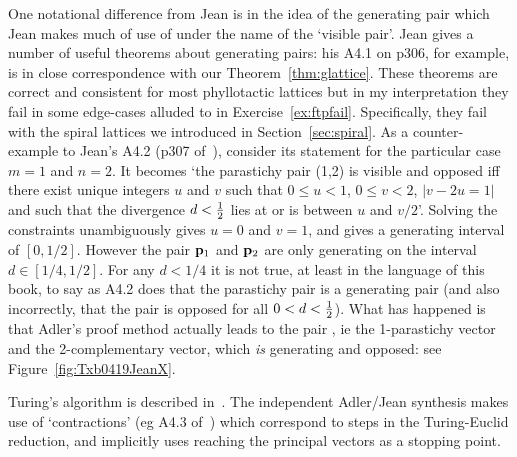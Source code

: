 One notational difference from Jean is in the idea of the generating pair which Jean makes much of use of under the name of the `visible pair'. Jean gives a number of useful theorems about generating pairs: his A4.1 on p306, for example,  is in close correspondence with our Theorem~\ref{thm:glattice}. These theorems are correct and consistent for most phyllotactic lattices but in my interpretation they fail in some edge-cases  alluded to in Exercise~\ref{ex:ftpfail}. Specifically, they fail with the spiral lattices we introduced in Section~\ref{sec:spiral}.
As a counter-example to Jean's A4.2 (p307 of~\cite{jeanPhyllotaxisSystemicStudy1994}), consider its statement for the particular case  $m=1$ and $n=2$. It becomes `the parastichy pair (1,2) is visible and opposed iff there exist unique integers $u$ and $v$ such that $0\leq u<1$, $0\leq v<2$, $|v-2u=1|$ and such that the divergence $d<\textstyle{\frac{1}{2}}$ lies at or is between $u$ and $v/2$'. Solving the constraints unambiguously gives $u=0$ and $v=1$, and gives a generating interval of $[0,1/2]$.  However the pair ${\mathbf p}_{1}$ and ${\mathbf p}_{2}$ are only generating on the interval $d\in [1/4,1/2]$. 
 For any $d<1/4$ it is not true, at least in the language of this book, to say as  
 A4.2 does that the parastichy pair   is a generating pair (and also incorrectly, that the pair is opposed for all $0<d<\textstyle{\frac{1}{2}}$).  What has happened is that Adler's proof method actually leads to the pair , ie the 1-parastichy vector and the 2-complementary vector, which \textit{is} generating and opposed: see Figure~\ref{fig:Txb0419JeanX}.


Turing's algorithm is described in~\cite{turingMorphogenTheoryPhyllotaxis2013}. The independent Adler/Jean synthesis  makes use of `contractions' (eg A4.3 of~\cite{jeanPhyllotaxisSystemicStudy1994}) which correspond to steps in the Turing-Euclid reduction, and implicitly uses reaching the principal  vectors as a stopping point. 

